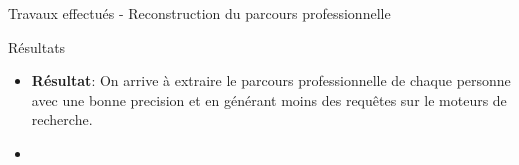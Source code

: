 \documentclass{beamer}
\begin{document}
{{\begin{frame}{Travaux effectués - Reconstruction du parcours professionnelle}
\begin{block}{Résultats}
\begin{itemize}
\item \textbf{Résultat}: On arrive à extraire le parcours professionnelle de chaque personne avec une bonne precision et en générant moins des requêtes sur le moteurs de recherche.  
\end{itemize}
\end{block}

\begin{itemize}
\small
\item
\end{itemize}

\end{frame}


%


}}
\end{document}
